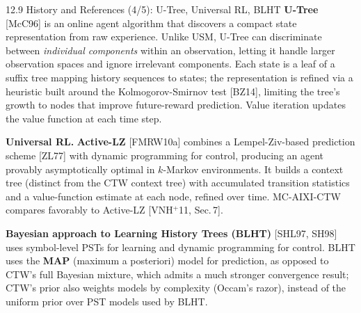 \documentclass[aspectratio=169,10pt]{beamer}
\begin{document}
\begin{frame}{12.9 History and References (4/5): U-Tree, Universal RL, BLHT}
\textbf{U-Tree} [McC96] is an online agent algorithm that discovers a compact state
representation from raw experience. Unlike USM, U-Tree can discriminate between
\emph{individual components} within an observation, letting it handle larger observation
spaces and ignore irrelevant components. Each state is a leaf of a suffix tree mapping
history sequences to states; the representation is refined via a heuristic built around
the Kolmogorov-Smirnov test [BZ14], limiting the tree's growth to nodes that improve
future-reward prediction. Value iteration updates the value function at each time step.

\textbf{Universal RL.} \textbf{Active-LZ} [FMRW10a] combines a Lempel-Ziv-based prediction
scheme [ZL77] with dynamic programming for control, producing an agent provably
asymptotically optimal in $k$-Markov environments. It builds a context tree (distinct from
the CTW context tree) with accumulated transition statistics and a value-function
estimate at each node, refined over time. MC-AIXI-CTW compares favorably to Active-LZ
[VNH$^+$11, Sec.\,7].

\textbf{Bayesian approach to Learning History Trees (BLHT)} [SHL97, SH98] uses symbol-level
PSTs for learning and dynamic programming for control. BLHT uses the \textbf{MAP}
(maximum a posteriori) model for prediction, as opposed to CTW's full Bayesian mixture,
which admits a much stronger convergence result; CTW's prior also weights models by
complexity (Occam's razor), instead of the uniform prior over PST models used by BLHT.
\end{frame}
\end{document}

